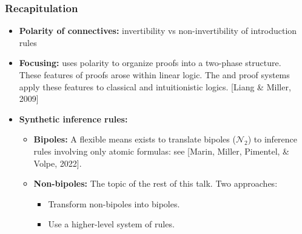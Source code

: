 \documentclass[9pt]{beamer}
\begin{document}
\begin{frame}
\frametitle{Recapitulation}

\begin{itemize}

\item \textbf{Polarity of connectives:} invertibility vs
  non-invertibility of introduction rules\\[10pt]

\item \textbf{Focusing:} uses polarity to organize proofs into a
  two-phase structure.\\[10pt]

  These features of proofs arose within linear logic.  The \LKF and
  \LJF proof systems apply these features to classical and
  intuitionistic logics.  [Liang \& Miller, 2009]\\[10pt]

\item \textbf{Synthetic inference rules:}
\pause
  \begin{itemize}
  \item \textbf{Bipoles:} A flexible means exists to translate bipoles
    ($\mathcal{N}_2$) to inference rules involving only atomic
    formulas: see [Marin, Miller, Pimentel, \& Volpe, 2022].\\[6pt]
\pause

  \item \textbf{Non-bipoles:} The topic of the rest of this talk. Two
    approaches:
    \begin{itemize}
    \item Transform non-bipoles into bipoles.
    \item Use a higher-level system of rules.
    \end{itemize}
  \end{itemize}

\end{itemize}

\end{frame}
\end{document}
